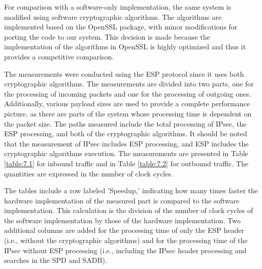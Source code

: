For comparison with a software-only implementation, the same system is modified using software cryptographic algorithms. The algorithms are implemented based on the OpenSSL package, with minor modifications for porting the code to our system. This decision is made because the implementation of the algorithms in OpenSSL is highly optimized and thus it provides a competitive comparison.

The measurements were conducted using the ESP protocol since it uses both cryptographic algorithms. The measurements are divided into two parts, one for the processing of incoming packets and one for the processing of outgoing ones. Additionally, various payload sizes are used to provide a complete performance picture, as there are parts of the system whose processing time is dependent on the packet size. The paths measured include the total processing of IPsec, the ESP processing, and both of the cryptographic algorithms. It should be noted that the measurement of IPsec includes ESP processing, and ESP includes the cryptographic algorithms execution. The measurements are presented in Table \ref{table:7.1} for inbound traffic and in Table \ref{table:7.2} for outbound traffic. The quantities are expressed in the number of clock cycles.

The tables include a row labeled 'Speedup,' indicating how many times faster the hardware implementation of the measured part is compared to the software implementation. This calculation is the division of the number of clock cycles of the software implementation by those of the hardware implementation. Two additional columns are added for the processing time of only the ESP header (i.e., without the cryptographic algorithms) and for the processing time of the IPsec without ESP processing (i.e., including the IPsec header processing and searches in the SPD and SADB).


